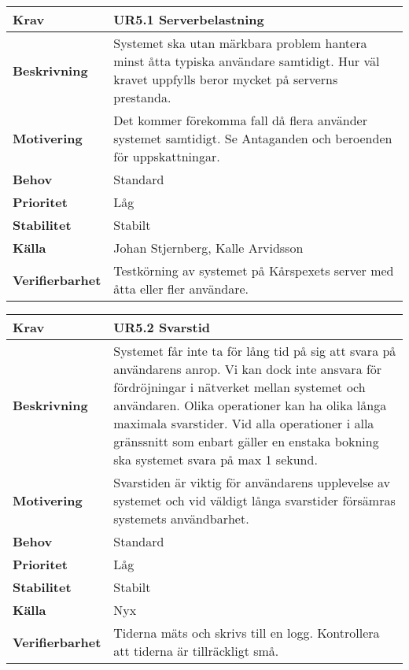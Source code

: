 \documentclass[a4paper, twoside, 11pt, titlepage]{article}
\begin{document}
		\begin {table} [ht] \begin{tabular} { p{2.6cm} p{12.5cm} }
			\hline
			{\sffamily\textbf{Krav}} & {\sffamily\textbf{UR5.1 Serverbelastning}} \\
			\hline
			{\sffamily\textbf{Beskrivning}} & {Systemet ska utan märkbara problem hantera minst åtta typiska användare samtidigt. Hur väl kravet uppfylls beror mycket på serverns prestanda.} \\
			\hline
			{\sffamily\textbf{Motivering}} & {Det kommer förekomma fall då flera använder systemet samtidigt. Se Antaganden och beroenden för uppskattningar.} \\
			\hline
			{\sffamily\textbf{Behov}} & {Standard} \\
			\hline
			{\sffamily\textbf{Prioritet}} & {Låg} \\
			\hline
			{\sffamily\textbf{Stabilitet}} & {Stabilt} \\
			\hline
			{\sffamily\textbf{Källa}} & {Johan Stjernberg, Kalle Arvidsson} \\
			\hline
			{\sffamily\textbf{Verifierbarhet}} & {Testkörning av systemet på Kårspexets server med åtta eller fler användare.} \\
			\hline
		\end{tabular} \end{table} \FloatBarrier
		\vspace{6mm}

		\begin {table} [ht] \begin{tabular} { p{2.6cm} p{12.5cm} }
			\hline
			{\sffamily\textbf{Krav}} & {\sffamily\textbf{UR5.2 Svarstid}} \\
			\hline
			{\sffamily\textbf{Beskrivning}} & {Systemet får inte ta för lång tid på sig att svara på användarens anrop. Vi kan dock inte ansvara för fördröjningar i nätverket mellan systemet och användaren. Olika operationer kan ha olika långa maximala svarstider. Vid alla operationer i alla gränssnitt som enbart gäller en enstaka bokning ska systemet svara på max 1 sekund.} \\
			\hline
			{\sffamily\textbf{Motivering}} & {Svarstiden är viktig för användarens upplevelse av systemet och vid väldigt långa svarstider försämras systemets användbarhet.} \\
			\hline
			{\sffamily\textbf{Behov}} & {Standard} \\
			\hline
			{\sffamily\textbf{Prioritet}} & {Låg} \\
			\hline
			{\sffamily\textbf{Stabilitet}} & {Stabilt} \\
			\hline
			{\sffamily\textbf{Källa}} & {Nyx} \\
			\hline
			{\sffamily\textbf{Verifierbarhet}} & {Tiderna mäts och skrivs till en logg. Kontrollera att tiderna är tillräckligt små.} \\
			\hline
		\end{tabular} \end{table} \FloatBarrier
		\vspace{6mm}
\end{document}
